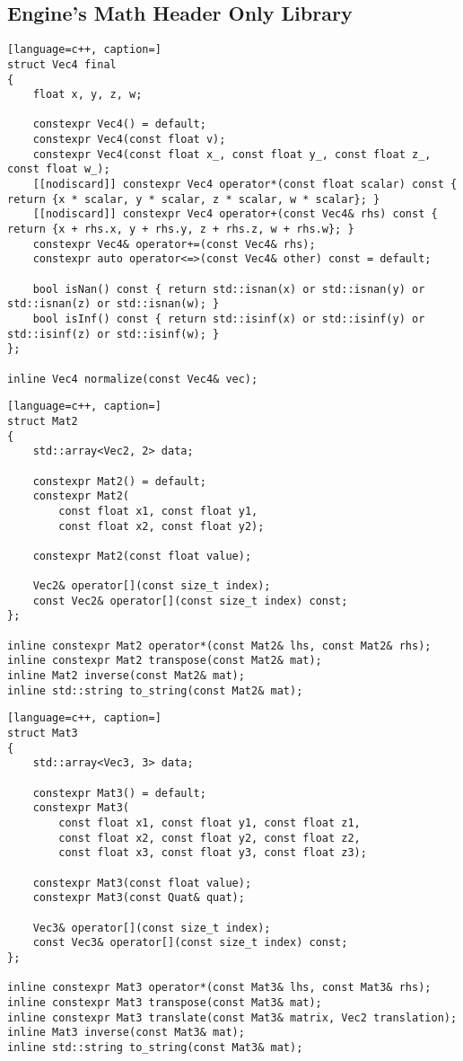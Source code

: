 \newpage

\subsection{Engine's Math Header Only Library}
\label{sec:math}

\begin{lstlisting}[language=c++, caption=]
struct Vec4 final
{
    float x, y, z, w;

    constexpr Vec4() = default;
    constexpr Vec4(const float v);
    constexpr Vec4(const float x_, const float y_, const float z_, const float w_);
    [[nodiscard]] constexpr Vec4 operator*(const float scalar) const { return {x * scalar, y * scalar, z * scalar, w * scalar}; }
    [[nodiscard]] constexpr Vec4 operator+(const Vec4& rhs) const { return {x + rhs.x, y + rhs.y, z + rhs.z, w + rhs.w}; }
    constexpr Vec4& operator+=(const Vec4& rhs);
    constexpr auto operator<=>(const Vec4& other) const = default;

    bool isNan() const { return std::isnan(x) or std::isnan(y) or std::isnan(z) or std::isnan(w); }
    bool isInf() const { return std::isinf(x) or std::isinf(y) or std::isinf(z) or std::isinf(w); }
};

inline Vec4 normalize(const Vec4& vec);
\end{lstlisting}

\begin{lstlisting}[language=c++, caption=]
struct Mat2
{
    std::array<Vec2, 2> data;

    constexpr Mat2() = default;
    constexpr Mat2(
        const float x1, const float y1,
        const float x2, const float y2);

    constexpr Mat2(const float value);

    Vec2& operator[](const size_t index);
    const Vec2& operator[](const size_t index) const;
};

inline constexpr Mat2 operator*(const Mat2& lhs, const Mat2& rhs);
inline constexpr Mat2 transpose(const Mat2& mat);
inline Mat2 inverse(const Mat2& mat);
inline std::string to_string(const Mat2& mat);
\end{lstlisting}

\begin{lstlisting}[language=c++, caption=]
struct Mat3
{
    std::array<Vec3, 3> data;

    constexpr Mat3() = default;
    constexpr Mat3(
        const float x1, const float y1, const float z1,
        const float x2, const float y2, const float z2,
        const float x3, const float y3, const float z3);

    constexpr Mat3(const float value);
    constexpr Mat3(const Quat& quat);

    Vec3& operator[](const size_t index);
    const Vec3& operator[](const size_t index) const;
};

inline constexpr Mat3 operator*(const Mat3& lhs, const Mat3& rhs);
inline constexpr Mat3 transpose(const Mat3& mat);
inline constexpr Mat3 translate(const Mat3& matrix, Vec2 translation);
inline Mat3 inverse(const Mat3& mat);
inline std::string to_string(const Mat3& mat);
\end{lstlisting}

